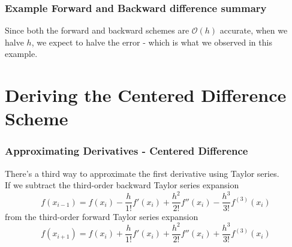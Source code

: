 \documentclass{if-beamer}
\begin{document}


\begin{frame}
\frametitle{Example Forward and Backward difference summary}
Since both the forward and backward schemes are $\mathcal{O}(h)$ accurate, when we halve $h$, we expect to halve the error - which is what we observed in this example. 
\end{frame}

\section{Deriving the Centered Difference Scheme}
\begin{frame}
\frametitle{Approximating Derivatives - Centered Difference}
There's a third way to approximate the first derivative using Taylor series. 
\\\vspace{5pt}
If we subtract the third-order backward Taylor series expansion 
$$f(x_{i-1}) = f(x_i) -\frac{h}{1!}f'(x_i) + \frac{h^2}{2!}f''(x_i)-\frac{h^3}{3!}f^{(3)}(x_i)$$
from the third-order forward Taylor series expansion
$$f(x_{i+1}) = f(x_i) +\frac{h}{1!}f'(x_i) + \frac{h^2}{2!}f''(x_i)+ \frac{h^3}{3!}f^{(3)}(x_i)$$
\end{frame}
\end{document}
